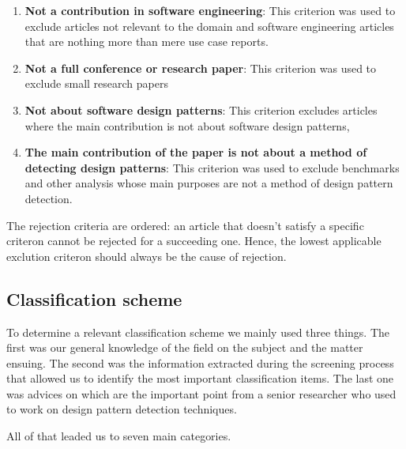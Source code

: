 \documentclass[letterpaper, 10 pt, conference]{ieeeconf}  %
\begin{document}
\begin{enumerate}
  \item \textbf{Not a contribution in software engineering}: 
    This criterion was used to exclude articles not relevant to the domain and
    software engineering articles that are nothing more than mere use case
    reports.
  \item \textbf{Not a full conference or research paper}:
    This criterion was used to exclude small research papers
  \item \textbf{Not about software design patterns}:
    This criterion excludes articles where the main contribution is not about
    software design patterns,
  \item \textbf{The main contribution of the paper is not about a method of detecting design patterns}:
    This criterion was used to exclude benchmarks and other analysis whose main
    purposes are not a method of design pattern detection.
\end{enumerate}

The rejection criteria are ordered: an article that doesn't satisfy a specific
criteron cannot be rejected for a succeeding one.
Hence, the lowest applicable exclution criteron should always be the cause of
rejection.

\subsection{Classification scheme}

To determine a relevant classification scheme we mainly used three things.
The first was our general knowledge of the field on the subject and the matter
ensuing.
The second was the information extracted during the screening process that
allowed us to identify the most important classification items.
The last one was advices on which are the important point from a senior
researcher who used to work on design pattern detection techniques.

All of that leaded us to seven main categories.
\end{document}
